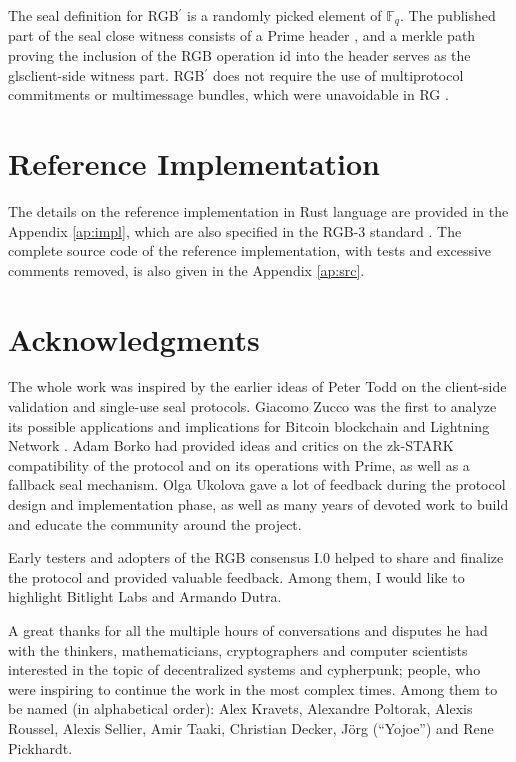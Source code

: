 \documentclass[9pt,oneside]{amsart}
\def\bitcoin{%
  \leavevmode
  \vtop{\offinterlineskip %
    \setbox0=\hbox{B}%
    \setbox2=\hbox to\wd0{\hfil\hskip-.03em
    \vrule height .3ex width .15ex\hskip .08em
    \vrule height .3ex width .15ex\hfil}
    \vbox{\copy2\box0}\box2}}
\begin{document}
\begin{multicols}{2}
The seal definition for RGB$^\prime$ is a randomly picked element of $\mathbb{F}_q$.
The published part of the \gls{seal close witness} consists of a Prime header \cite{Prime},
and a merkle path proving the inclusion of the RGB operation id into the header
serves as the gls{client-side witness part}.
RGB$^\prime$ does not require the use of multiprotocol commitments or multimessage bundles,
which were unavoidable in RG\bitcoin.

\section{Reference Implementation}

The details on the reference implementation in Rust language are provided in the Appendix \ref{ap:impl},
which are also specified in the RGB-3 standard \cite{RGB3}.
The complete source code of the reference implementation, with tests and excessive comments removed,
is also given in the Appendix \ref{ap:src}.


\section{Acknowledgments}
The whole work was inspired by the earlier ideas of Peter Todd
on the client-side validation \cite{CSV} and single-use seal \cite{SUS1, SUS2} protocols.
Giacomo Zucco was the first to analyze its possible applications and
implications for Bitcoin blockchain and Lightning Network \cite{Zucco}.
Adam Borko had provided ideas and critics on the zk-STARK compatibility of the protocol and
on its operations with Prime, as well as a \gls{fallback seal} mechanism.
Olga Ukolova gave a lot of feedback during the protocol design and implementation phase,
as well as many years of devoted work to build and educate the community around the project.

Early testers and adopters of the RGB consensus I.0 helped to share and finalize the protocol
and provided valuable feedback.
Among them, I would like to highlight Bitlight Labs and Armando Dutra.

A great thanks for all the multiple hours of conversations and disputes he had with
the thinkers, mathematicians, cryptographers and computer scientists
interested in the topic of decentralized systems and cypherpunk;
people, who were inspiring to continue the work in the most complex times.
Among them to be named (in alphabetical order):
Alex Kravets, Alexandre Poltorak, Alexis Roussel, Alexis Sellier,
Amir Taaki, Christian Decker, Jörg (``Yojoe'') and Rene Pickhardt.


\end{multicols}
\end{document}

